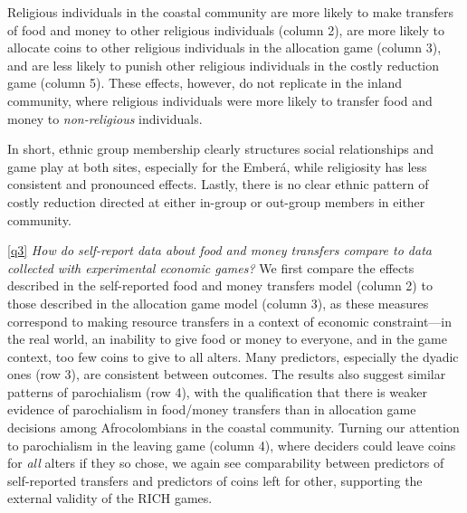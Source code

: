 \documentclass[bibauthoryear]{aa}
\begin{document}
 Religious individuals in the coastal community are more likely to make transfers of food and money to other religious individuals (column 2), are more likely to allocate coins to other religious individuals in the allocation game (column 3), and are less likely to punish other religious individuals in the costly reduction game (column 5). These effects, however, do not replicate in the inland community, where religious individuals were more likely to transfer food and money to \textit{non-religious} individuals. 
 
 In short, ethnic group membership clearly structures social relationships and game play at both sites, especially for the Ember\'a, while religiosity has less consistent and pronounced effects. Lastly, there is no clear ethnic pattern of costly reduction directed at either in-group or out-group members in either community.


\ref{q3} \emph{How do self-report data about food and money transfers compare to data collected with experimental economic games?} We first compare the effects described in the self-reported food and money transfers model (column 2) to those described in the allocation game model (column 3), as these measures correspond to making resource transfers in a context of economic constraint---in the real world, an inability to give food or money to everyone, and in the game context, too few coins to give to all alters. Many predictors, especially the dyadic ones (row 3), are consistent between  outcomes. The results also suggest similar patterns of parochialism (row 4), with the qualification that there is weaker evidence of parochialism in food/money transfers than in allocation game decisions among Afrocolombians in the coastal community. Turning our attention to parochialism in the leaving game (column 4), where deciders could leave coins for \textit{all} alters if they so chose, we again see comparability between predictors of self-reported transfers and predictors of coins left for other, supporting the external validity of the RICH games.
\end{document}
